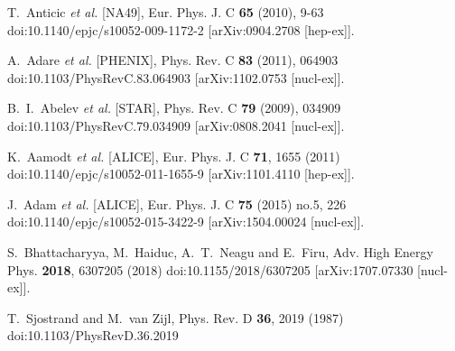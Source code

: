 \begin{thebibliography}{99}
T.~Anticic \textit{et al.} [NA49],
Eur. Phys. J. C \textbf{65} (2010), 9-63
doi:10.1140/epjc/s10052-009-1172-2
[arXiv:0904.2708 [hep-ex]].



A.~Adare \textit{et al.} [PHENIX],
Phys. Rev. C \textbf{83} (2011), 064903
doi:10.1103/PhysRevC.83.064903
[arXiv:1102.0753 [nucl-ex]].

B.~I.~Abelev \textit{et al.} [STAR],
Phys. Rev. C \textbf{79} (2009), 034909
doi:10.1103/PhysRevC.79.034909
[arXiv:0808.2041 [nucl-ex]].

K.~Aamodt \textit{et al.} [ALICE],
Eur. Phys. J. C \textbf{71}, 1655 (2011)
doi:10.1140/epjc/s10052-011-1655-9
[arXiv:1101.4110 [hep-ex]].

J.~Adam \textit{et al.} [ALICE],
Eur. Phys. J. C \textbf{75} (2015) no.5, 226
doi:10.1140/epjc/s10052-015-3422-9
[arXiv:1504.00024 [nucl-ex]].

S.~Bhattacharyya, M.~Haiduc, A.~T.~Neagu and E.~Firu,
Adv. High Energy Phys. \textbf{2018}, 6307205 (2018)
doi:10.1155/2018/6307205
[arXiv:1707.07330 [nucl-ex]].

T.~Sjostrand and M.~van Zijl,
Phys. Rev. D \textbf{36}, 2019 (1987)
doi:10.1103/PhysRevD.36.2019


\end{thebibliography}
